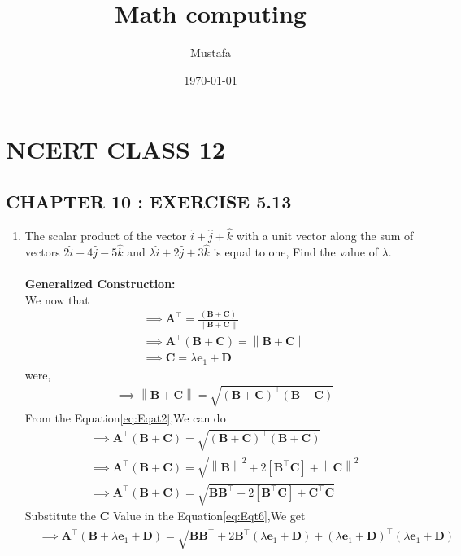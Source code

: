 \documentclass[8pt, a4paper]{article}
\title{ Math computing}
\author{ Mustafa}
\date{\today}
\let\vec\mathbf
\providecommand{\brak}[1]{\ensuremath{\left(#1\right)}}
\providecommand{\sbrak}[1]{\ensuremath{{}\left[#1\right]}}
\providecommand{\norm}[1]{\left\lVert#1\right\rVert}
\begin{document}
\section*{NCERT CLASS 12}
\subsection*{CHAPTER 10 : EXERCISE 5.13}
\begin{enumerate}
\item\textbf{}The scalar product of the vector $\hat{i}+\hat{j}+\hat{k}$ with a unit vector along the sum of vectors $2\hat{i}+4\hat{j}-5\hat{k}$ and $\lambda\hat{i}+2\hat{j}+3\hat{k}$ is equal to one, Find the value of $\lambda$.
\\\\
\textbf{Generalized Construction:}\\
We now that \\
\begin{align}
   &\implies \vec{A}^\top = \frac{\brak{\vec{B}+\vec{C}}}{\norm{\vec{B}+\vec{C}}}\\
       &\implies \vec{A}^\top \brak{\vec{B}+\vec{C}}=\norm{\vec{B}+\vec{C}} \label{eq:Eqat2}\\
       &\implies \vec{C}=\lambda\vec{e}_1+\vec{D}\label{eq:EQT-C}
    \end{align}
    were,
    \begin{align}
       &\implies \norm{\vec{B}+\vec{C}}= \sqrt{\brak{\vec{B}+\vec{C}}^\top\brak{\vec{B}+\vec{C}}}
    \end{align}
From the Equation\eqref{eq:Eqat2},We can do
\begin{align}
   &\implies \vec{A}^\top \brak{\vec{B}+\vec{C}}=\sqrt{\brak{\vec{B}+\vec{C}}^\top\brak{\vec{B}+\vec{C}}}\\
&\implies \vec{A}^\top \brak{\vec{B}+\vec{C}}=\sqrt{\norm{\vec{B}}^2+2\sbrak{\vec{B}^{\top}\vec{C}}+\norm{\vec{C}}^2}\\
&\implies \vec{A}^\top \brak{\vec{B}+\vec{C}}=\sqrt{{\vec{B}\vec{B}^{\top}}+2\sbrak{\vec{B}^{\top}\vec{C}}+{\vec{C}^\top\vec{C}}}\label{eq:Eqt6}
\end{align}
Substitute the $\vec{C}$ Value in the Equation\eqref{eq:Eqt6},We get
\begin{align}
&\implies\vec{A}^{\top}\brak{\vec{B}+\lambda\vec{e}_1+\vec{D}}=\sqrt{\vec{B}\vec{B}^{\top}+2\vec{B}^{\top}\brak{\lambda\vec{e}_1+\vec{D}}+\brak{\lambda\vec{e}_1+\vec{D}}^{\top}\brak{\lambda\vec{e}_1+\vec{D}}}\\
\end{align}

\end{enumerate}
\end{document}
